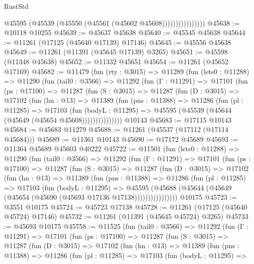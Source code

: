 \begin{lexlean}{RustStd}
\begin{coremodule}
                          @45595 (@45539 (@45550 (@45561 (@45602 @45608))))))))))))))))
@45638 := @10118 @10255
@45639 := @45637 @45638
@45640 := @45545 @45638
@45644 := @11261 (@17125 (@45640 @17139) @17146)
@45645 := @45556 @45638
@45649 := @11261 (@11391 (@45645 @17139) @3265)
@45651 := @45598 (@11348 @45638)
@45652 := @11332 @45651
@45654 := @11261 (@45652 @17169)
@45682 := @11479
    (fun (rty : @3015) =>
    @11289
      (fun (lets0 : @11288) =>
      @11290
        (fun (tail0 : @3566) =>
        @11292
          (fun (Γ : @11291) =>
          @17101
            (fun (ps : @17100) =>
            @11287
              (fun (S : @3015) =>
              @11287
                (fun (D : @3015) =>
                @17102
                  (fun (hn : @13) =>
                  @11389
                    (fun (pns : @11388) =>
                    @11286
                      (fun (pl : @11285) =>
                      @17103
                        (fun (bodyL : @11295) =>
                        @45595 (@45539 (@45644 (@45649 (@45654 @45608)))))))))))))))
    @10143
@45683 := @17115 @10143
@45684 := @45683 @11279
@45688 := @11261 (@45537 (@17112 (@17114 @45684)))
@45689 := @11361 @10143
@45690 := @17172 @45689
@45693 := @11364 @45689 @45603 @40222
@45722 := @11501
    (fun (lets0 : @11288) =>
    @11290
      (fun (tail0 : @3566) =>
      @11292
        (fun (Γ : @11291) =>
        @17101
          (fun (ps : @17100) =>
          @11287
            (fun (S : @3015) =>
            @11287
              (fun (D : @3015) =>
              @17102
                (fun (hn : @13) =>
                @11389
                  (fun (pns : @11388) =>
                  @11286
                    (fun (pl : @11285) =>
                    @17103
                      (fun (bodyL : @11295) =>
                      @45595
                        (@45688
                          (@45644 (@45649 (@45654 (@45690 (@45693 @17136 @17138))))))))))))))))
    @10175
@45723 := @3551 @10175
@45724 := @45723 @17138
@45728 := @11261 (@17125 (@45640 @45724) @17146)
@45732 := @11261 (@11391 (@45645 @45724) @3265)
@45733 := @45693 @10175
@45758 := @11525
    (fun (tail0 : @3566) =>
    @11292
      (fun (Γ : @11291) =>
      @17101
        (fun (ps : @17100) =>
        @11287
          (fun (S : @3015) =>
          @11287
            (fun (D : @3015) =>
            @17102
              (fun (hn : @13) =>
              @11389
                (fun (pns : @11388) =>
                @11286
                  (fun (pl : @11285) =>
                  @17103
                    (fun (bodyL : @11295) =>

\end{coremodule}
\end{lexlean}
